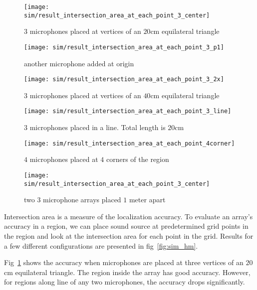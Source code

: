 \begin{figure*}[]
  \centering
  \begin{subfigure}[]{.3\textwidth}
    \texttt{[image: sim/result\_intersection\_area\_at\_each\_point\_3\_center]}
    \caption{$3$ microphones placed at vertices of an $20$cm equilateral triangle}
    \label{fig:sim_hm_3}
  \end{subfigure}
  \begin{subfigure}[]{.3\textwidth}
    \texttt{[image: sim/result\_intersection\_area\_at\_each\_point\_3\_p1]}
    \caption{another microphone added at origin}
    \label{fig:sim_hm_3_p1}
  \end{subfigure}
  \begin{subfigure}[]{.3\textwidth}
    \texttt{[image: sim/result\_intersection\_area\_at\_each\_point\_3\_2x]}
    \caption{$3$ microphones placed at vertices of an $40$cm equilateral triangle}
    \label{fig:sim_hm_3_2x}
  \end{subfigure}
  \begin{subfigure}[]{.3\textwidth}
    \texttt{[image: sim/result\_intersection\_area\_at\_each\_point\_3\_line]}
    \caption{$3$ microphones placed in a line. Total length is $20$cm}
    \label{fig:sim_hm_3_line}
  \end{subfigure}
  \begin{subfigure}[]{.3\textwidth}
    \texttt{[image: sim/result\_intersection\_area\_at\_each\_point\_4corner]}
    \caption{$4$ microphones placed at $4$ corners of the region}
    \label{fig:sim_hm_4}
  \end{subfigure}
  \begin{subfigure}[]{.3\textwidth}
    \texttt{[image: sim/result\_intersection\_area\_at\_each\_point\_3\_center]}
    \caption{two $3$ microphone arrays placed $1$ meter apart}
    \label{fig:sim_hm_2_array}
  \end{subfigure}
  \caption{Accuracy for different array configurations}
  \label{fig:sim_hm}
\end{figure*}

Intersection area is a measure of the localization accuracy. To evaluate an array's accuracy in a region, we can place sound source at predetermined grid points in the region and look at the intersection area for each point in the grid. Results for a few different configurations are presented in fig~\ref{fig:sim_hm}.

Fig~\ref{fig:sim_hm_3} shows the accuracy when microphones are placed at three vertices of an $20$ cm equilateral triangle. The region inside the array has good accuracy. However, for regions along line of any two microphones, the accuracy drops significantly. 

